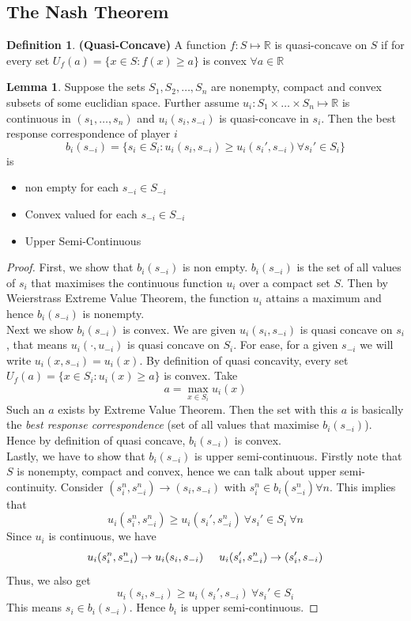 \documentclass{article}
\theoremstyle{definition}
\newtheorem{lem}{Lemma}[section]
\newtheorem{defn}{Definition}[section]
\begin{document}
\subsection{The Nash Theorem}
\begin{defn}
\textbf{(Quasi-Concave)} A function $f:S\mapsto \mathbb{R}$ is quasi-concave on $S$ if for every set $U_f(a) = \{x\in S: f(x)\geq a\}$ is convex $\forall a\in \mathbb{R}$
\end{defn}
\begin{lem}
\label{Best Resp Upper Semi}
Suppose the sets $S_1,S_2,\dots,S_n$ are nonempty, compact and convex subsets of some euclidian space. Further assume $u_i: S_1\times\dots\times S_n \mapsto\mathbb{R}$ is continuous in $(s_1,\dots,s_n)$ and $u_i(s_i,s_{-i})$ is quasi-concave in $s_i$. Then the best response correspondence of player $i$ $$b_i(s_{-i}) = \{s_i\in S_i: u_i(s_i,s_{-i})\geq u_i(s_i',s_{-i}) \forall s_i'\in S_i\}$$ is 
\begin{itemize}
	\item non empty for each $s_{-i}\in S_{-i}$
	\item Convex valued for each $s_{-i}\in S_{-i}$
	\item Upper Semi-Continuous
\end{itemize}
\end{lem}
\begin{proof}
First, we show that $b_i(s_{-i})$ is non empty. $b_i(s_{-i})$ is the set of all values of $s_i$ that maximises the continuous function $u_i$ over a compact set $S$. Then by Weierstrass Extreme Value Theorem, the function $u_i$ attains a maximum and hence $b_i(s_{-i})$ is nonempty.\\

Next we show $b_i(s_{-i})$ is convex. We are given $u_i(s_i,s_{-i})$ is quasi concave on $s_i$, that means $u_i(\cdot, u_{-i})$ is quasi concave on $S_i$. For ease, for a given $s_{-i}$ we will write $u_i(x,s_{-i}) = u_i(x)$. By definition of quasi concavity, every set $U_f(a) = \{x\in S_i: u_i(x)\geq a\}$ is convex. Take $$a= \max_{x\in S_i} u_i(x)$$ Such an $a$ exists by Extreme Value Theorem. Then the set with this $a$ is basically the \textit{best response correspondence} (set of all values that maximise $b_i(s_{-i})$). Hence by definition of quasi concave, $b_i(s_{-i})$ is convex.\\

Lastly, we have to show that $b_i(s_{-i})$ is upper semi-continuous. Firstly note that $S$ is nonempty, compact and convex, hence we can talk about upper semi-continuity. Consider $(s_i^n, s_{-i}^n)\to (s_i,s_{-i})$ with $s_i^n \in b_i(s_{-i}^n) \forall n$. This implies that $$u_i(s_i^n, s_{-i}^n) \geq u_i(s_i', s_{-i}^n)~\forall s_i'\in S_i~\forall n$$ Since $u_i$ is continuous, we have $$u_i(s_i^n, s_{-i}^n) \to u_i(s_i, s_{-i}) \hspace{5mm} u_i(s_i', s_{-i}^n)\to (s_i', s_{-i})$$ Thus, we also get $$u_i(s_i,s_{-i}) \geq u_i(s_i',s_{-i})~\forall s_i'\in S_i$$ This means $s_i\in b_i(s_{-i})$. Hence $b_i$ is upper semi-continuous.
\end{proof}
\end{document}
